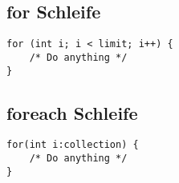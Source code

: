 \subsection{for Schleife}
\begin{lstlisting}[caption=for Schleife]
for (int i; i < limit; i++) {
    /* Do anything */
}
\end{lstlisting}

\subsection{foreach Schleife}
\begin{lstlisting}[caption=foreach Schleife]
for(int i:collection) {
    /* Do anything */
}
\end{lstlisting}
